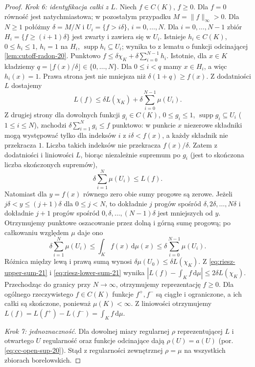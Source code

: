 \begin{proof}
\emph{Krok 6: identyfikacja całki z $L$.}
Niech $f\in C(K)$, $f\ge0$. Dla $f=0$ równość jest natychmiastowa; w pozostałym przypadku $M=\|f\|_\infty>0$.
Dla $N\ge1$ połóżmy $\delta=M/N$ i
$U_i=\{f>i\delta\}$, $i=0,\ldots,N$.
Dla $i=0,\ldots,N-1$ zbiór
$H_i=\{f\ge(i+1)\delta\}$ jest zwarty i zawiera się
w $U_i$. Istnieje $h_i\in C(K)$, $0\le h_i\le1$,
$h_i=1$ na $H_i$, $\operatorname{supp}h_i\subseteq U_i$;
wynika to z lematu o funkcji odcinającej
\ref{lem:cutoff-radon-20}. Punktowo
$f\le\delta\chi_K+\delta\sum_{i=0}^{N-1}h_i$.
Istotnie, dla $x\in K$ kładziemy
$q=\lfloor f(x)/\delta\rfloor\in\{0,\ldots,N\}$.
Dla $0\le i<q$ mamy $x\in H_i$, a więc $h_i(x)=1$.
Prawa strona jest nie mniejsza niż
$\delta(1+q)\ge f(x)$.
Z dodatniości $L$ dostajemy
\begin{equation}\label{eq:riesz-upper-sum-21}
 L(f)\le\delta L(\chi_K)+
           \delta\sum_{i=0}^{N-1}\mu(U_i).
\end{equation}
Z drugiej strony dla dowolnych funkcji
$g_i\in C(K)$, $0\le g_i\le1$,
$\operatorname{supp}g_i\subseteq U_i$ ($1\le i\le N$),
zachodzi $\delta\sum_{i=1}^{N}g_i\le f$ punktowo:
w punkcie $x$ niezerowe składniki mogą występować
tylko dla indeksów $i$ z $i\delta<f(x)$, a każdy
składnik nie przekracza $1$. Liczba takich indeksów
nie przekracza $f(x)/\delta$.
Zatem z dodatniości i liniowości $L$, biorąc
niezależnie supremum po $g_i$ (jest to skończona
liczba skończonych supremów),
\begin{equation}\label{eq:riesz-lower-sum-21}
 \delta\sum_{i=1}^{N}\mu(U_i)\le L(f).
\end{equation}
Natomiast dla $y=f(x)$ równego zero obie sumy
progowe są zerowe. Jeżeli $j\delta<y\le(j+1)\delta$
dla $0\le j<N$, to dokładnie $j$ progów spośród
$\delta,2\delta,\ldots,N\delta$ i dokładnie $j+1$
progów spośród $0,\delta,\ldots,(N-1)\delta$
jest mniejszych od $y$. Otrzymujemy punktowe
oszacowanie przez dolną i górną sumę progową;
po całkowaniu względem $\mu$ daje ono
\[
 \delta\sum_{i=1}^{N}\mu(U_i)
 \le\int_Kf(x)\,\mathrm d\mu(x)
 \le\delta\sum_{i=0}^{N-1}\mu(U_i).
\]
Różnica między lewą i prawą sumą wynosi
$\delta\mu(U_0)\le\delta L(\chi_K)$.
Z \eqref{eq:riesz-upper-sum-21} i
\eqref{eq:riesz-lower-sum-21} wynika
$|L(f)-\int_K f\,\mathrm d\mu|\le2\delta L(\chi_K)$.
Przechodząc do granicy przy $N\to\infty$, otrzymujemy reprezentację
$f\ge0$. Dla ogólnego rzeczywistego $f\in C(K)$
funkcje $f^+,f^-$ są ciągłe i ograniczone,
a ich całki są skończone, ponieważ $\mu(K)<\infty$.
Z liniowości otrzymujemy
$L(f)=L(f^+)-L(f^-)=\int_K f\,\mathrm d\mu$.

\emph{Krok 7: jednoznaczność.}
Dla dowolnej miary regularnej $\rho$ reprezentującej $L$
i otwartego $U$ regularność oraz funkcje odcinające
dają $\rho(U)=a(U)$ (por.
\eqref{eq:cc-open-sup-20}). Stąd z regularności
zewnętrznej $\rho=\mu$ na wszystkich zbiorach
borelowskich.
\end{proof}

